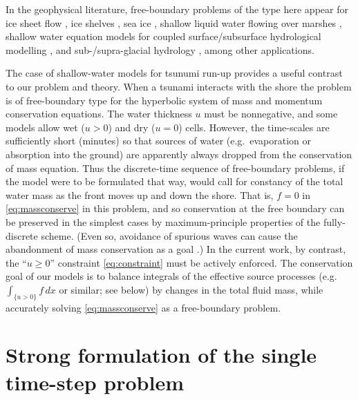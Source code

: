 \documentclass[final,leqno,onefignum,onetabnum]{siamltex1213bueler}
\begin{document}
In the geophysical literature, free-boundary problems of the type here appear for ice sheet flow \cite{Bueler2015,Bueleretal2005,CalvoDuranyVazquez2000,Calvoetal2002,EgholmNielsen2010,JouvetBueler2012}, ice shelves \cite{Albrechtetal2011}, sea ice \cite[and references therein]{LipscombHunke2004}, shallow liquid water flowing over marshes \cite{AlonsoSantillanaDawson2008}, shallow water equation models for coupled surface/subsurface hydrological modelling \cite{Maxwelletal2014}, and sub-/supra-glacial hydrology \cite{Aschwandenetal2012,BuelervanPelt2015,Schoofetal2012}, among other applications.

The case of shallow-water models for tsunumi run-up \cite{LeVequeetal2011} provides a useful contrast to our problem and theory.  When a tsunami interacts with the shore the problem is of free-boundary type for the hyperbolic system of mass and momentum conservation equations.  The water thickness $u$ must be nonnegative, and some models allow wet ($u>0$) and dry ($u=0$) cells.  However, the time-scales are sufficiently short (minutes) so that sources of water (e.g.~evaporation or absorption into the ground) are apparently always dropped from the conservation of mass equation.  Thus the discrete-time sequence of free-boundary problems, if the model were to be formulated that way, would call for constancy of the total water mass as the front moves up and down the shore.  That is, $f=0$ in \eqref{eq:massconserve} in this problem, and so conservation at the free boundary can be preserved in the simplest cases by maximum-principle properties of the fully-discrete scheme.  (Even so, avoidance of spurious waves can cause the abandonment of mass conservation as a goal \cite[section 9.2]{LeVequeetal2011}.)  In the current work, by contrast, the ``$u\ge 0$'' constraint \eqref{eq:constraint} must be actively enforced.  The conservation goal of our models is to balance integrals of the effective source processes (e.g.~$\int_{\{u>0\}} f\,dx$ or similar; see below) by changes in the total fluid mass, while accurately solving \eqref{eq:massconserve} as a free-boundary problem.


\section{Strong formulation of the single time-step problem}  \label{sec:strongform}
\end{document}
